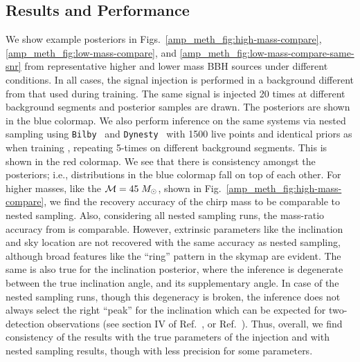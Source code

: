 \begin{refsection}
\section{\label{amp_meth_sec:results}Results and Performance}
We show example posteriors in Figs.~\ref{amp_meth_fig:high-mass-compare}, \ref{amp_meth_fig:low-mass-compare}, and \ref{amp_meth_fig:low-mass-compare-same-snr} from representative higher and lower mass BBH sources under different conditions. 
In all cases, the signal injection is performed in a background different from that used during training. 
The same signal is injected 20 times at different background segments and posterior samples are drawn. 
The posteriors are shown in the blue colormap. 
We also perform inference on the same systems via nested sampling using \texttt{Bilby}~\cite{Ashton_2019, Romero_Shaw_2020} and \texttt{Dynesty}~\cite{Speagle:2019ivv} with 1500 live points and identical priors as when training {\amplfi}, repeating 5-times on different background segments.
This is shown in the red colormap. 
We see that there is consistency amongst the {\amplfi} posteriors; i.e., distributions in the blue colormap fall on top of each other.
For higher masses, like the $\mathcal{M} = 45\;M_{\odot}$, shown in Fig.~\ref{amp_meth_fig:high-mass-compare}, we find the recovery accuracy of the chirp mass to be comparable to nested sampling. 
Also, considering all nested sampling runs, the mass-ratio accuracy from {\amplfi} is comparable. 
However, extrinsic parameters like the inclination and sky location are not recovered with the same accuracy as nested sampling, although broad features like the ``ring'' pattern in the skymap are evident. 
The same is also true for the inclination posterior, where the inference is degenerate between the true inclination angle, and its supplementary angle. 
In case of the nested sampling runs, though this degeneracy is broken, the inference does not always select the right ``peak'' for the inclination which can be expected for two-detection observations (see section IV of Ref.~\cite{CuFl1994}, or Ref.~\cite{Nissanke:2009kt}).
Thus, overall, we find consistency of the {\amplfi} results with the true parameters of the injection and with nested sampling results, though with less precision for some parameters.


\end{refsection}
